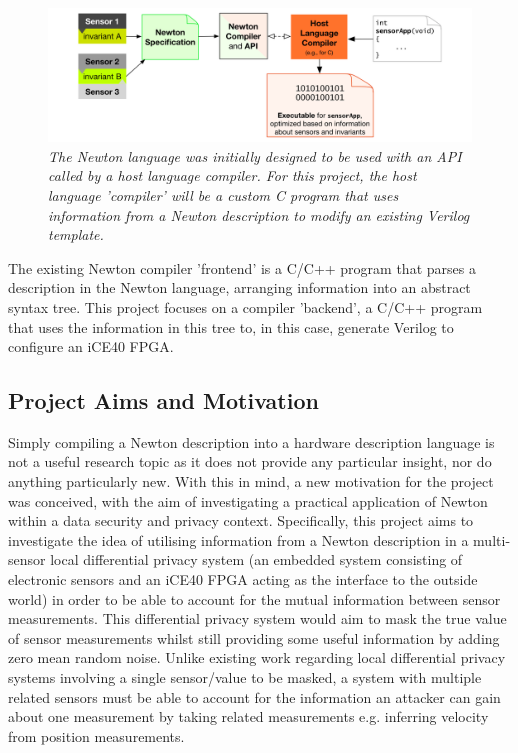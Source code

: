 \documentclass[pageno]{jpaper}
\begin{document}
\begin{figure}[h]
  \centering
    \includegraphics[width=\columnwidth]{images/Newton-and-C-Compiler-Interaction.png}
    \caption{\textit{The Newton language was initially designed to be used with an API called by a host language compiler\cite{Newton}. For this project, the host language 'compiler' will be a custom C program that uses information from a Newton description to modify an existing Verilog template.}}
    \label{fig:newton_compiler_interaction}
\end{figure}

The existing Newton compiler 'frontend' is a C/C++ program that parses a description in the Newton language, arranging information into an abstract syntax tree. This project focuses on a compiler 'backend', a C/C++ program that uses the information in this tree to, in this case, generate Verilog to configure an iCE40 FPGA.

\subsection{Project Aims and Motivation}
Simply compiling a Newton description into a hardware description language is not a useful research topic as it does not provide any particular insight, nor do anything particularly new. With this in mind, a new motivation for the project was conceived, with the aim of investigating a practical application of Newton within a data security and privacy context. Specifically, this project aims to investigate the idea of utilising information from a Newton description in a multi-sensor local differential privacy system (an embedded system consisting of electronic sensors and an iCE40 FPGA acting as the interface to the outside world) in order to be able to account for the mutual information between sensor measurements. This differential privacy system would aim to mask the true value of sensor measurements whilst still providing some useful information by adding zero mean random noise. Unlike existing work regarding local differential privacy systems involving a single sensor/value to be masked\cite{Choi2018GuaranteeingLD}, a system with multiple related sensors must be able to account for the information an attacker can gain about one measurement by taking related measurements e.g. inferring velocity from position measurements.
\end{document}
